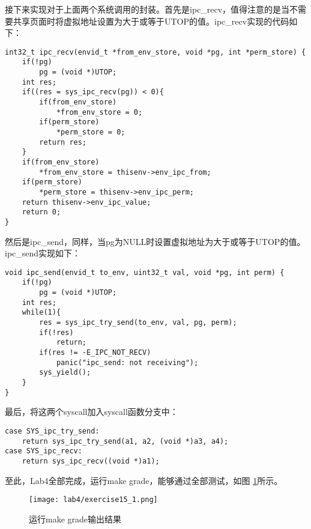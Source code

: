 \begin{exerciseSolution}{15}
    \par 接下来实现对于上面两个系统调用的封装。首先是ipc\_recv，值得注意的是当不需要共享页面时将虚拟地址设置为大于或等于UTOP的值。ipc\_recv实现的代码如下：
    \begin{lstlisting}
int32_t ipc_recv(envid_t *from_env_store, void *pg, int *perm_store) {
    if(!pg)
        pg = (void *)UTOP;
    int res;
    if((res = sys_ipc_recv(pg)) < 0){
        if(from_env_store)
            *from_env_store = 0;
        if(perm_store)
            *perm_store = 0;
        return res;
    }
    if(from_env_store)
        *from_env_store = thisenv->env_ipc_from;
    if(perm_store)
        *perm_store = thisenv->env_ipc_perm;
    return thisenv->env_ipc_value;
	return 0;
}
    \end{lstlisting}

    \par 然后是ipc\_send，同样，当pg为NULL时设置虚拟地址为大于或等于UTOP的值。ipc\_send实现如下：
    \begin{lstlisting}
void ipc_send(envid_t to_env, uint32_t val, void *pg, int perm) {
    if(!pg)
        pg = (void *)UTOP;
    int res;
    while(1){
        res = sys_ipc_try_send(to_env, val, pg, perm);
        if(!res)
            return;
        if(res != -E_IPC_NOT_RECV)
            panic("ipc_send: not receiving");
        sys_yield();
    }
}
    \end{lstlisting}
	\par 最后，将这两个syscall加入syscall函数分支中：
    \begin{lstlisting}
case SYS_ipc_try_send:
    return sys_ipc_try_send(a1, a2, (void *)a3, a4);
case SYS_ipc_recv:
    return sys_ipc_recv((void *)a1);
    \end{lstlisting}
\end{exerciseSolution}
\par 至此，Lab4全部完成，运行make grade，能够通过全部测试，如图 \ref{fig:lab4/exercise15_1}所示。
\begin{figure}[htb]
    \centering
    \texttt{[image: lab4/exercise15\_1.png]}
    \caption{运行make grade输出结果}
    \label{fig:lab4/exercise15_1}
\end{figure}



